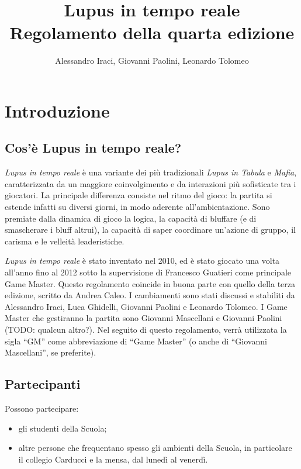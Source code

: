 \documentclass[a4paper,10pt]{article}
\title{Lupus in tempo reale\\ Regolamento della quarta edizione}
\author{Alessandro Iraci, Giovanni Paolini, Leonardo Tolomeo}
\begin{document}
\maketitle


\section{Introduzione}

\subsection{Cos'è Lupus in tempo reale?}

\emph{Lupus in tempo reale} è una variante dei più tradizionali \emph{Lupus in Tabula} e \emph{Mafia}, caratterizzata da un maggiore coinvolgimento e da interazioni più sofisticate tra i giocatori.
La principale differenza consiste nel ritmo del gioco: la partita si estende infatti su diversi giorni, in modo aderente all'ambientazione.
Sono premiate dalla dinamica di gioco la logica, la capacità di bluffare (e di smascherare i bluff altrui), la capacità di saper coordinare un’azione di gruppo, il carisma e le velleità leaderistiche.

\emph{Lupus in tempo reale} è stato inventato nel 2010, ed è stato giocato una volta all'anno fino al 2012 sotto la supervisione di Francesco Guatieri come principale Game Master.
Questo regolamento coincide in buona parte con quello della terza edizione, scritto da Andrea Caleo.
I cambiamenti sono stati discussi e stabiliti da Alessandro Iraci, Luca Ghidelli, Giovanni Paolini e Leonardo Tolomeo.
I Game Master che gestiranno la partita sono Giovanni Mascellani e Giovanni Paolini (TODO: qualcun altro?).
Nel seguito di questo regolamento, verrà utilizzata la sigla ``GM'' come abbreviazione di ``Game Master'' (o anche di ``Giovanni Mascellani'', se preferite).


\subsection{Partecipanti}

Possono partecipare:
\begin{itemize}
 \item gli studenti della Scuola;
 \item altre persone che frequentano spesso gli ambienti della Scuola, in particolare il collegio Carducci e la mensa, dal lunedì al venerdì.
\end{itemize}
\end{document}
